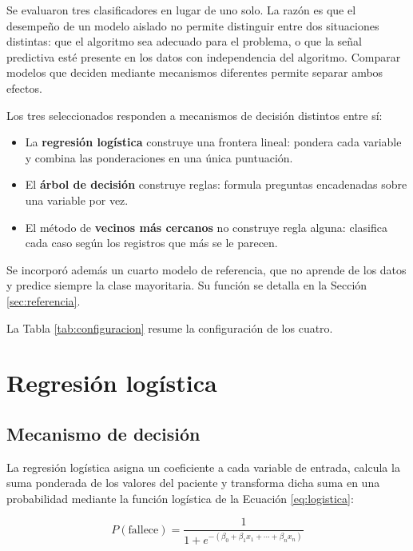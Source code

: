 \documentclass[11pt]{article}
\begin{document}
Se evaluaron tres clasificadores en lugar de uno solo. La razón es que el desempeño de un modelo
aislado no permite distinguir entre dos situaciones distintas: que el algoritmo sea adecuado para
el problema, o que la señal predictiva esté presente en los datos con independencia del algoritmo.
Comparar modelos que deciden mediante mecanismos diferentes permite separar ambos efectos.

Los tres seleccionados responden a mecanismos de decisión distintos entre sí:

\begin{itemize}
\item La \textbf{regresión logística} construye una frontera lineal: pondera cada variable y
      combina las ponderaciones en una única puntuación.
\item El \textbf{árbol de decisión} construye reglas: formula preguntas encadenadas sobre una
      variable por vez.
\item El método de \textbf{vecinos más cercanos} no construye regla alguna: clasifica cada caso
      según los registros que más se le parecen.
\end{itemize}

Se incorporó además un cuarto modelo de referencia, que no aprende de los datos y predice siempre
la clase mayoritaria. Su función se detalla en la Sección \ref{sec:referencia}.

La Tabla \ref{tab:configuracion} resume la configuración de los cuatro.



\section{Regresión logística}

\subsection{Mecanismo de decisión}

La regresión logística asigna un coeficiente a cada variable de entrada, calcula la suma ponderada
de los valores del paciente y transforma dicha suma en una probabilidad mediante la función
logística de la Ecuación \eqref{eq:logistica}:

\begin{equation}
P(\text{fallece}) = \frac{1}{1 + e^{-(\beta_0 + \beta_1 x_1 + \cdots + \beta_n x_n)}}
\label{eq:logistica}
\end{equation}
\end{document}
